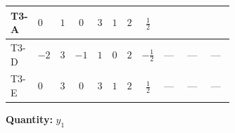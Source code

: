 \documentclass[8pt]{article}
\begin{document}
\begin{landscape}
\begin{longtable}{@{}llcccccc >{\raggedright\arraybackslash}p{0.21\linewidth} >{\raggedright\arraybackslash}p{0.21\linewidth} >{\raggedright\arraybackslash}p{0.21\linewidth}@{}}
\midrule
T3-A & $0$ & $1$ & $0$ & $3$ & $1$ & $2$ & $\frac{1}{2}$ & \scriptsize\adjustbox{max width=\linewidth}{$\begin{gathered} +\frac{3}{4} \left({y_2}\,\left({y_2}\right)^{\dagger}\,{y_1}\right)_{ij}\end{gathered}$} & \scriptsize\adjustbox{max width=\linewidth}{$\begin{gathered} +\frac{1}{2} \left({Y_e}\,\left({Y_e}\right)^{\dagger}\,{y_1}\right)_{ij}\end{gathered}$} & \scriptsize\adjustbox{max width=\linewidth}{$\begin{gathered} +\left({y_1}\,\left({y_1}\right)^{\dagger}\,{y_1}\right)_{ij}\end{gathered}$} \\
\midrule
T3-D & $-2$ & $3$ & $-1$ & $1$ & $0$ & $2$ & $-\frac{1}{2}$ & --- & --- & --- \\
\midrule
T3-E & $0$ & $3$ & $0$ & $3$ & $1$ & $2$ & $\frac{1}{2}$ & --- & --- & --- \\
\midrule
\bottomrule
\end{longtable}
\clearpage
\noindent\textbf{Quantity: }$y_1$\par\smallskip

\end{landscape}
\end{document}
